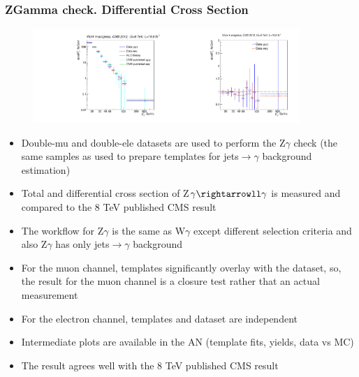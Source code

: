 \begin{frame}\frametitle{ZGamma check. Differential Cross Section}
\begin{figure}[htb]
  \begin{center}
 \includegraphics[width=0.45\textwidth]{../figs/figs_v11/ChannelsMERGED_ZGamma/CrossSection/compareCSZGamma.pdf}\includegraphics[width=0.45\textwidth]{../figs/figs_v11/ChannelsMERGED_ZGamma/CrossSection/compareCSratioOttoZGamma.pdf}
  \end{center}
\end{figure}
  \tiny
  \begin{itemize}
     \item Double-mu and double-ele datasets are used to perform the Z$\gamma$ check (the same samples as used to prepare templates for jets$\rightarrow\gamma$ background estimation)
     \item Total and differential cross section of Z$\gamma\rightarrowll\gamma$ is measured and compared to the 8 TeV published CMS result
     \item The workflow for Z$\gamma$ is the same as W$\gamma$ except different selection criteria and also Z$\gamma$ has only jets$\rightarrow\gamma$ background
     \item For the muon channel, templates significantly overlay with the dataset, so, the result for the muon channel is a closure test rather that an actual measurement
     \item For the electron channel, templates and dataset are independent
     \item Intermediate plots are available in the AN (template fits, yields, data vs MC)
     \item The result agrees well with the 8 TeV published CMS result
  \end{itemize}
\end{frame}%
